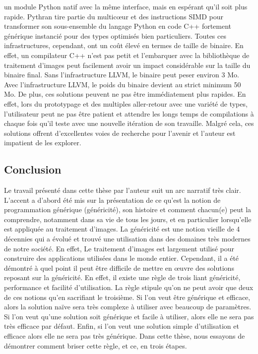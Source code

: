 un module Python natif avec la même interface, mais en espérant qu'il soit plus rapide. Pythran tire partie du
multic\oe{}ur et des instructions SIMD pour transformer son sous-ensemble du langage Python en code C++ fortement
générique instancié pour des types optimisés bien particuliers. Toutes ces infrastructures, cependant, ont un coût élevé
en termes de taille de binaire. En effet, un compilateur C++ n'est pas petit et l'embarquer avec la bibliothèque de
traitement d'images peut facilement avoir un impact considérable sur la taille du binaire final. Sans l'infrastructure
LLVM, le binaire peut peser environ 3 Mo. Avec l'infrastructure LLVM, le poids du binaire devient au strict minimum 50
Mo. De plus, ces solutions peuvent ne pas être immédiatement plus rapides. En effet, lors du prototypage et des
multiples aller-retour avec une variété de types, l'utilisateur peut ne pas être patient et attendre les longs temps de
compilations à chaque fois qu'il teste avec une nouvelle itération de son travaille. Malgré cela, ces solutions offrent
d'excellentes voies de recherche pour l'avenir et l'auteur est impatient de les explorer.


\subsection*{Conclusion}


Le travail présenté dans cette thèse par l'auteur suit un arc narratif très clair. L'accent a d'abord été mis sur la
présentation de ce qu'est la notion de programmation générique (généricité), son histoire et comment chacun(e) peut la
comprendre, notamment dans sa vie de tous les jours, et en particulier lorsqu'elle est appliquée au traitement d'images.
La généricité est une notion vieille de 4 décennies qui a évolué et trouvé une utilisation dans des domaines très
modernes de notre société. En effet, Le traitement d'images est largement utilisé pour construire des applications
utilisées dans le monde entier. Cependant, il a été démontré à quel point il peut être difficile de mettre en \oe{}uvre
des solutions reposant sur la généricité. En effet, il existe une règle de trois liant généricité, performance et
facilité d'utilisation. La règle stipule qu'on ne peut avoir que deux de ces notions qu'en sacrifiant le troisième. Si
l'on veut être générique et efficace, alors la solution naïve sera très complexe à utiliser avec beaucoup de paramètres.
Si l'on veut qu'une solution soit générique et facile à utiliser, alors elle ne sera pas très efficace par défaut.
Enfin, si l'on veut une solution simple d'utilisation et efficace alors elle ne sera pas très générique. Dans cette
thèse, nous essayons de démontrer comment briser cette règle, et ce, en trois étapes.

